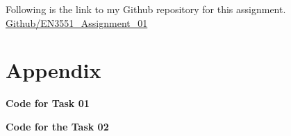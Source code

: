 \documentclass[11pt,a4paper]{article}
\begin{document}
Following is the link to my Github repository for this assignment.\\

\href{https://github.com/Vgr20/EN_3551_Assignment_01.git}{Github/EN3551\_Assignment\_01}


\newpage

\twocolumn
\section{Appendix}

\textbf{Code for Task 01}

\lstset{style=mystyle}


\newpage

\textbf{Code for the Task 02}

\lstset{style=mystyle}

\end{document}

